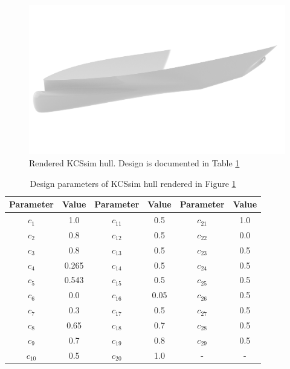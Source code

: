 \documentclass{report}
\begin{document}
\begin{figure}[H]
    \centering
    \includegraphics[width=\linewidth]{figures/test-3-kcssim-render.png}
    \caption{Rendered KCSsim hull. Design is documented in Table \ref{tab:test-3-kcssim-design}}
    \label{fig:test-3-kcssim-render}
\end{figure}
\begin{table}[H]
    \centering
    \begin{tabular}{|c|c|c|c|c|c|}
        \hline 
        Parameter & Value & Parameter & Value & Parameter & Value\\
        \hline 
        $c_1$ & 1.0 & $c_{11}$ & 0.5 & $c_{21}$ & 1.0 \\
        \hline 
        $c_2$ & 0.8 & $c_{12}$ & 0.5 & $c_{22}$ & 0.0\\
        \hline 
        $c_3$ & 0.8 & $c_{13}$ & 0.5 & $c_{23}$ & 0.5 \\
        \hline 
        $c_4$ & 0.265 & $c_{14}$ & 0.5 & $c_{24}$ & 0.5 \\
        \hline 
        $c_5$ & 0.543 & $c_{15}$ & 0.5 & $c_{25}$ & 0.5 \\
        \hline 
        $c_6$ & 0.0 & $c_{16}$ & 0.05 & $c_{26}$ & 0.5 \\
        \hline 
        $c_7$ & 0.3 & $c_{17}$ & 0.5 & $c_{27}$ & 0.5 \\
        \hline 
        $c_8$ & 0.65 & $c_{18}$ & 0.7 & $c_{28}$ & 0.5 \\
        \hline 
        $c_9$ & 0.7 & $c_{19}$ & 0.8 & $c_{29}$ & 0.5 \\
        \hline 
        $c_{10}$ & 0.5 & $c_{20}$ & 1.0 & - & - \\
        \hline 
    \end{tabular}
    \caption{Design parameters of KCSsim hull rendered in Figure \ref{fig:test-3-kcssim-render}}
    \label{tab:test-3-kcssim-design}
\end{table}
\end{document}
